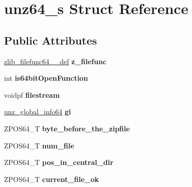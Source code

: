 \hypertarget{structunz64__s}{}\section{unz64\+\_\+s Struct Reference}
\label{structunz64__s}
\subsection*{Public Attributes}
\begin{DoxyCompactItemize}
\item 
\mbox{\label{structunz64__s_a01d834fe3f5d52a7d2d760088ae0e76b}} 
\hyperlink{structzlib__filefunc64__32__def__s}{zlib\+\_\+filefunc64\+\_\+\_\+def} {\bfseries z\+\_\+filefunc}
\item 
\mbox{\label{structunz64__s_a4fdb44d053423216223ce9ea7f415e84}} 
int {\bfseries is64bit\+Open\+Function}
\item 
\mbox{\label{structunz64__s_ae8f0d283404defa363a10cc367a795b1}} 
voidpf {\bfseries filestream}
\item 
\mbox{\label{structunz64__s_a5ba3128f450a732ba83065b99f984d38}} 
\hyperlink{structunz__global__info64__s}{unz\+\_\+global\+\_\+info64} {\bfseries gi}
\item 
\mbox{\label{structunz64__s_af898009d3afb95676c5f1d482fa71ed0}} 
Z\+P\+O\+S64\+\_\+T {\bfseries byte\+\_\+before\+\_\+the\+\_\+zipfile}
\item 
\mbox{\label{structunz64__s_ab269fbe15e5c11cb0b034281c29be611}} 
Z\+P\+O\+S64\+\_\+T {\bfseries num\+\_\+file}
\item 
\mbox{\label{structunz64__s_a304767ee88ee980f3eb44861cdb5d5a2}} 
Z\+P\+O\+S64\+\_\+T {\bfseries pos\+\_\+in\+\_\+central\+\_\+dir}
\item 
\mbox{\label{structunz64__s_a4c77cce6b700dcadf88a420ed0fa0565}} 
Z\+P\+O\+S64\+\_\+T {\bfseries current\+\_\+file\+\_\+ok}
\item 
\mbox{\label{structunz64__s_a9ac60525f108ba995ccf46b85d8e80f5}} 

\end{DoxyCompactItemize}
